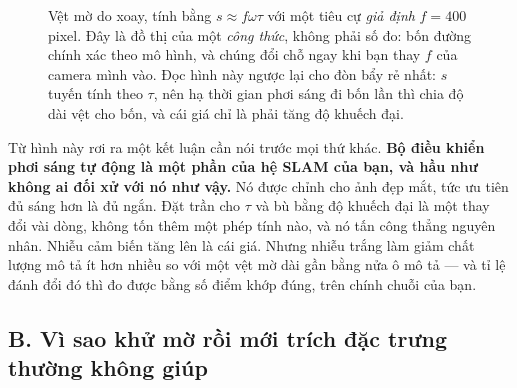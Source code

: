 \documentclass[../../deep_learning.tex]{subfiles}
\begin{document}
\begin{figure}[H]\centering
{}
\caption{Vệt mờ do xoay, tính bằng \(s \approx f\omega\tau\) với một tiêu cự \emph{giả định} \(f=400\) pixel. Đây là đồ thị của một \emph{công thức}, không phải số đo: bốn đường chính xác theo mô hình, và chúng đổi chỗ ngay khi bạn thay \(f\) của camera mình vào. Đọc hình này ngược lại cho đòn bẩy rẻ nhất: \(s\) tuyến tính theo \(\tau\), nên hạ thời gian phơi sáng đi bốn lần thì chia độ dài vệt cho bốn, và cái giá chỉ là phải tăng độ khuếch đại.}
\label{fig:f34-mo-theo-toc-do}
\end{figure}

Từ hình này rơi ra một kết luận cần nói trước mọi thứ khác. \textbf{Bộ điều khiển phơi sáng tự động là một phần của hệ SLAM của bạn, và hầu như không ai đối xử với nó như vậy.} Nó được chỉnh cho ảnh đẹp mắt, tức ưu tiên đủ sáng hơn là đủ ngắn. Đặt trần cho \(\tau\) và bù bằng độ khuếch đại là một thay đổi vài dòng, không tốn thêm một phép tính nào, và nó tấn công thẳng nguyên nhân. Nhiễu cảm biến tăng lên là cái giá. Nhưng nhiễu trắng làm giảm chất lượng mô tả ít hơn nhiều so với một vệt mờ dài gần bằng nửa ô mô tả --- và tỉ lệ đánh đổi đó thì đo được bằng số điểm khớp đúng, trên chính chuỗi của bạn.

\subsection{B. Vì sao khử mờ rồi mới trích đặc trưng thường không giúp}
\end{document}
